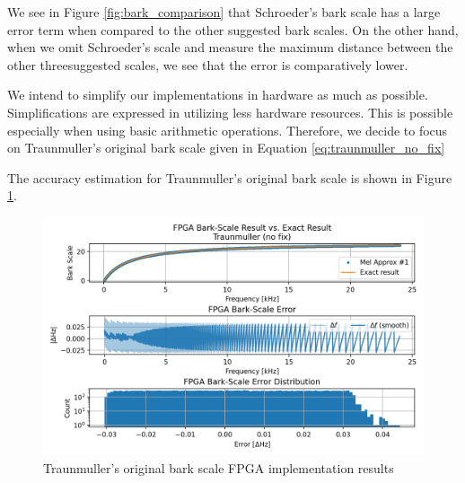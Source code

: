 We see in Figure \ref{fig:bark_comparison} that Schroeder's bark scale
has a large error term when compared to the other suggested bark scales.
On the other hand, when we omit Schroeder's scale
and measure the maximum distance between the other threesuggested scales,
we see that the error is comparatively lower. 

We intend to simplify our implementations in hardware as much as possible.
Simplifications are expressed in utilizing less hardware resources.
This is possible especially when using basic arithmetic operations.
Therefore, we decide to focus on Traunmuller's original bark scale
given in Equation \ref{eq:traunmuller_no_fix}

The accuracy estimation for Traunmuller's original bark scale
is shown in Figure \ref{fig:bark_traunmuller_no_fix}.

\begin{figure}[H]
    \centering
    \includegraphics[width=0.95\linewidth]{Scaling/images/bark_traunmuller_no_fix.png}
    \caption{Traunmuller's original bark scale FPGA implementation results}\label{fig:bark_traunmuller_no_fix}
\end{figure}

